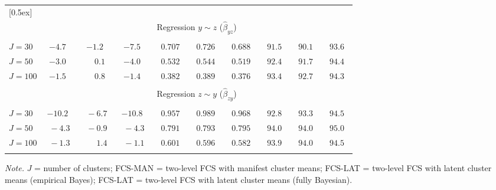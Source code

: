 \begin{table}[bt]
\begin{threeparttable}
\begin{tabular}{lccccccccc}
[0.5ex]\hline\\[-2.0ex] 
& \multicolumn{9}{c}{Regression $y \sim z$ ($\hat\beta_{yz}$)} \\[0.4ex]\hline\\[-2.0ex]
\nopagebreak $J=30$  & ${-}4.7\phantom{0}$ & ${-}1.2\phantom{0}$ & ${-}7.5\phantom{0}$ & $\phantom{0}0.707\phantom{0}$ & $\phantom{0}0.726\phantom{0}$ & $\phantom{0}0.688\phantom{0}$ & $\phantom{0}91.5\phantom{0}$ & $\phantom{0}90.1\phantom{0}$ & $\phantom{0}93.6\phantom{0}$ \\
\nopagebreak $J=50$  & ${-}3.0\phantom{0}$ & $\phantom{-}0.1\phantom{0}$ & ${-}4.0\phantom{0}$ & $\phantom{0}0.532\phantom{0}$ & $\phantom{0}0.544\phantom{0}$ & $\phantom{0}0.519\phantom{0}$ & $\phantom{0}92.4\phantom{0}$ & $\phantom{0}91.7\phantom{0}$ & $\phantom{0}94.4\phantom{0}$ \\
\nopagebreak $J=100$  & ${-}1.5\phantom{0}$ & $\phantom{-}0.8\phantom{0}$ & ${-}1.4\phantom{0}$ & $\phantom{0}0.382\phantom{0}$ & $\phantom{0}0.389\phantom{0}$ & $\phantom{0}0.376\phantom{0}$ & $\phantom{0}93.4\phantom{0}$ & $\phantom{0}92.7\phantom{0}$ & $\phantom{0}94.3\phantom{0}$ \\
[0.5ex]\hline\\[-2.0ex] 
& \multicolumn{9}{c}{Regression $z \sim y$ ($\hat\beta_{zy}$)} \\[0.4ex]\hline\\[-2.0ex]
\nopagebreak $J=30$  & ${-}10.2\phantom{0}$ & $\phantom{0}{-}6.7\phantom{0}$ & ${-}10.8\phantom{0}$ & $\phantom{0}0.957\phantom{0}$ & $\phantom{0}0.989\phantom{0}$ & $\phantom{0}0.968\phantom{0}$ & $\phantom{0}92.8\phantom{0}$ & $\phantom{0}93.3\phantom{0}$ & $\phantom{0}94.5\phantom{0}$ \\
\nopagebreak $J=50$  & $\phantom{0}{-}4.3\phantom{0}$ & $\phantom{0}{-}0.9\phantom{0}$ & $\phantom{0}{-}4.3\phantom{0}$ & $\phantom{0}0.791\phantom{0}$ & $\phantom{0}0.793\phantom{0}$ & $\phantom{0}0.795\phantom{0}$ & $\phantom{0}94.0\phantom{0}$ & $\phantom{0}94.0\phantom{0}$ & $\phantom{0}95.0\phantom{0}$ \\
\nopagebreak $J=100$  & $\phantom{0}{-}1.3\phantom{0}$ & $\phantom{0}\phantom{-}1.4\phantom{0}$ & $\phantom{0}{-}1.1\phantom{0}$ & $\phantom{0}0.601\phantom{0}$ & $\phantom{0}0.596\phantom{0}$ & $\phantom{0}0.582\phantom{0}$ & $\phantom{0}93.9\phantom{0}$ & $\phantom{0}94.0\phantom{0}$ & $\phantom{0}94.5\phantom{0}$ \\
[0.5ex]\hline\\[-1.8ex] 
\end{tabular}
\begin{tablenotes}{\footnotesize \textit{Note.} $J$ = number of clusters; FCS-MAN = two-level FCS with manifest cluster means; FCS-LAT = two-level FCS with latent cluster means (empirical Bayes); FCS-LAT = two-level FCS with latent cluster means (fully Bayesian).}\end{tablenotes}
\end{threeparttable}
\end{table}
